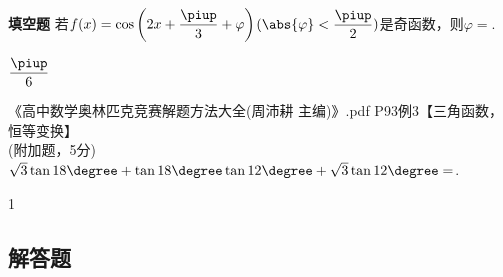 \begin{exercise}{\bf 填空题}
     若$f(x)=\cos\left(2x+\dfrac{\piup}3+\varphi\right)$$(\abs{\varphi}<\dfrac{\piup}2)$是奇函数，则$\varphi=$\tk.
     \begin{answer}
       $\dfrac{\piup}6$
     \end{answer}
    \item 《高中数学奥林匹克竞赛解题方法大全(周沛耕 主编)》.pdf P93例3【三角函数，恒等变换】\\
     (附加题，5分)
     $\sqrt3\tan{18\degree}+\tan{18\degree}\tan{12\degree}+\sqrt3\tan{12\degree}=$\tk.
     \begin{answer}
       1
     \end{answer}
  \end{exercise}
  \subsection{解答题}
